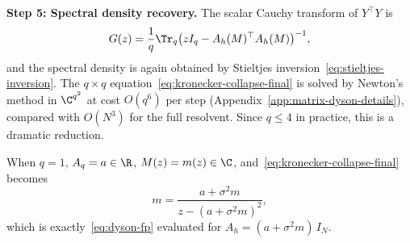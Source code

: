 \medskip
\noindent\textbf{Step 5: Spectral density recovery.}
The scalar Cauchy transform of $Y^\top Y$ is
\[
G(z) = \frac{1}{q}\Tr_q\bigl(zI_q - A_h(M)^\top A_h(M)\bigr)^{-1},
\]
and the spectral density is again obtained by Stieltjes inversion~\eqref{eq:stieltjes-inversion}. The $q \times q$ equation~\eqref{eq:kronecker-collapse-final} is solved by Newton's method in $\C^{q^2}$ at cost $O(q^6)$ per step (Appendix~\ref{app:matrix-dyson-details}), compared with $O(N^3)$ for the full resolvent. Since $q \leq 4$ in practice, this is a dramatic reduction.

\begin{remark}[Verification: $q = 1$ recovery]\label{rem:verification_recovery}
When $q = 1$, $A_q = a \in \R$, $M(z) = m(z) \in \C$, and~\eqref{eq:kronecker-collapse-final} becomes
\[
m = \frac{a + \sigma^2 m}{z - (a + \sigma^2 m)^2},
\]
which is exactly~\eqref{eq:dyson-fp} evaluated for $A_h = (a + \sigma^2 m)\,I_N$.
\end{remark}
